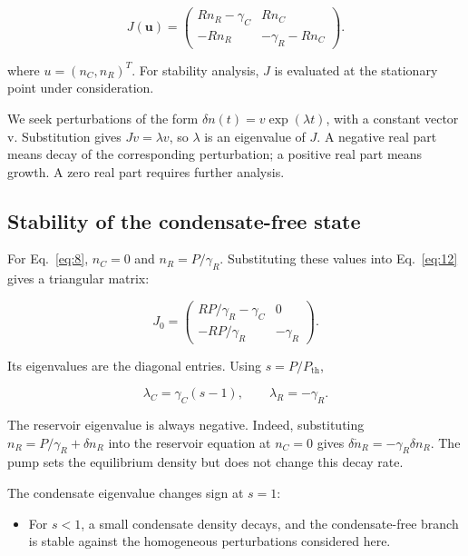 \documentclass[12pt,a4paper]{article}
\begin{document}
\begin{equation}\label{eq:12}
J(\mathbf u)=\begin{pmatrix}Rn_R-\gamma_C&Rn_C\\-Rn_R&-\gamma_R-Rn_C\end{pmatrix}.\end{equation}

where $u=(n_{C},n_{R})^T$. For stability analysis, $J$ is evaluated at the stationary point under consideration.

We seek perturbations of the form $\delta n(t)=v \exp(\lambda t)$, with a constant vector v. Substitution gives $J v=\lambda v$, so $\lambda$ is an eigenvalue of $J$. A negative real part means decay of the corresponding perturbation; a positive real part means growth. A zero real part requires further analysis.

\subsection{Stability of the condensate-free state}\label{sec:3.4}

For Eq.~\eqref{eq:8}, $n_{C}=0$ and $n_{R}=P/\gamma_{R}$. Substituting these values into Eq.~\eqref{eq:12} gives a triangular matrix:

\[
J_0=\begin{pmatrix}RP/\gamma_R-\gamma_C&0\\-RP/\gamma_R&-\gamma_R\end{pmatrix}.
\]

Its eigenvalues are the diagonal entries. Using $s=P/P_{\mathrm{th}}$,

\begin{equation}\label{eq:13}
\lambda_C=\gamma_C(s-1),\qquad\lambda_R=-\gamma_R.\end{equation}

The reservoir eigenvalue is always negative. Indeed, substituting $n_{R}=P/\gamma_{R}+\delta n_{R}$ into the reservoir equation at $n_{C}=0$ gives $\delta \dot n_R=-\gamma_{R} \delta n_{R}$. The pump sets the equilibrium density but does not change this decay rate.

The condensate eigenvalue changes sign at $s=1$:

\begin{itemize}\setlength{\itemsep}{3pt}\item For $s<1$, a small condensate density decays, and the condensate-free branch is stable against the homogeneous perturbations considered here.\end{itemize}
\end{document}
